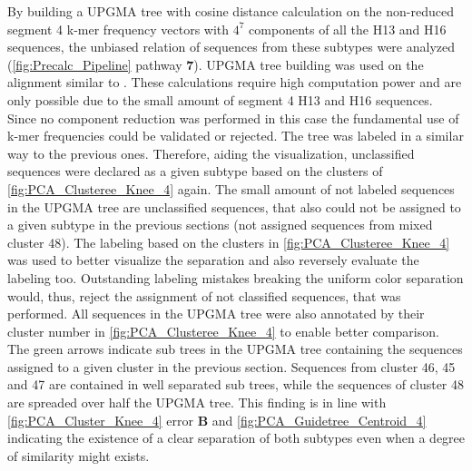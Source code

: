 By building a \gls{UPGMA} tree with cosine distance calculation on the non-reduced segment 4 k-mer frequency vectors with $4^7$ components of all the H13 and H16 sequences, the unbiased relation of sequences from these subtypes were analyzed (\autoref{fig:Precalc_Pipeline} pathway \textsf{\textbf{7}}). \gls{UPGMA} tree building was used on the alignment similar to \textcite{moss_identification_2011}. These calculations require high computation power and are only possible due to the small amount of segment 4 H13 and H16 sequences. Since no component reduction was performed in this case the fundamental use of k-mer frequencies could be validated or rejected. The tree was labeled in a similar way to the previous ones. Therefore, aiding the visualization, unclassified sequences were declared as a given subtype based on the clusters of \autoref{fig:PCA_Clusteree_Knee_4} again. The small amount of not labeled sequences in the \gls{UPGMA} tree are unclassified sequences, that also could not be assigned to a given subtype in the previous sections (not assigned sequences from mixed cluster 48). The labeling based on the clusters in \autoref{fig:PCA_Clusteree_Knee_4} was used to better visualize the separation and also reversely evaluate the labeling too. Outstanding labeling mistakes breaking the uniform color separation would, thus, reject the assignment of not classified sequences, that was performed. All sequences in the \gls{UPGMA} tree were also annotated by their cluster number in \autoref{fig:PCA_Clusteree_Knee_4} to enable better comparison. The green arrows indicate sub trees in the \gls{UPGMA} tree containing the sequences assigned to a given cluster in the previous section. Sequences from cluster 46, 45 and 47 are contained in well separated sub trees, while the sequences of cluster 48 are spreaded over half the \gls{UPGMA} tree. This finding is in line with \autoref{fig:PCA_Cluster_Knee_4} error \textbf{\textsf{B}} and \autoref{fig:PCA_Guidetree_Centroid_4} indicating the existence of a clear separation of both subtypes even when a degree of similarity might exists.

